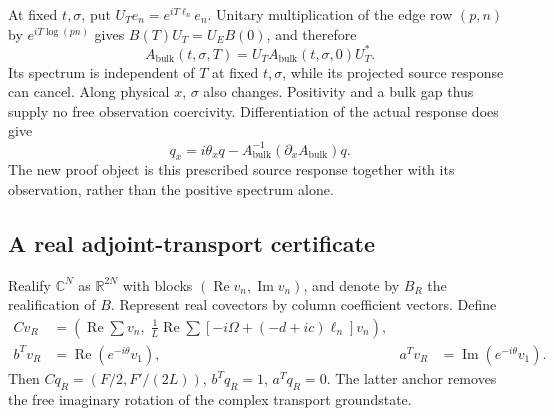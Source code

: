\documentclass[11pt]{article}
\theoremstyle{definition}
\theoremstyle{remark}
\newcommand{\Rea}{\operatorname{Re}}
\newcommand{\Ima}{\operatorname{Im}}
\newcommand{\Abulk}{A_{\mathrm{bulk}}}
\begin{document}
At fixed $t,\sigma$, put $U_Te_n=e^{iT\ell_n}e_n$.
Unitary multiplication of the edge row $(p,n)$ by $e^{iT\log(pn)}$
gives $B(T)U_T=U_EB(0)$, and therefore
\begin{equation}
 \Abulk(t,\sigma,T)=U_T\Abulk(t,\sigma,0)U_T^*.
 \label{eq:gauge}
\end{equation}
Its spectrum is independent of $T$ at fixed $t,\sigma$, while its
projected source response can cancel. Along physical $x$, $\sigma$
also changes. Positivity and a bulk gap thus supply no free observation
coercivity. Differentiation of the actual response does give
\begin{equation}
 q_x=i\theta_xq-\Abulk^{-1}(\partial_x\Abulk)q.
 \label{eq:source-derivative}
\end{equation}
The new proof object is this prescribed source response together with
its observation, rather than the positive spectrum alone.

\subsection{A real adjoint-transport certificate}

Realify $\mathbb C^N$ as $\mathbb R^{2N}$ with blocks
$(\Rea v_n,\Ima v_n)$, and denote by $B_R$ the realification of $B$.
Represent real covectors by column coefficient vectors. Define
\begin{align}
 Cv_R&=\left(\Rea\sum v_n,\;
    \frac1L\Rea\sum[-i\Omega+(-d+ic)\ell_n]v_n\right),\label{eq:C}\\
 b^Tv_R&=\Rea(e^{-i\theta}v_1),&
 a^Tv_R&=\Ima(e^{-i\theta}v_1).\nonumber
\end{align}
Then $Cq_R=(F/2,F'/(2L))$, $b^Tq_R=1$, $a^Tq_R=0$.
The latter anchor removes the free imaginary rotation of the complex
transport groundstate.
\end{document}
